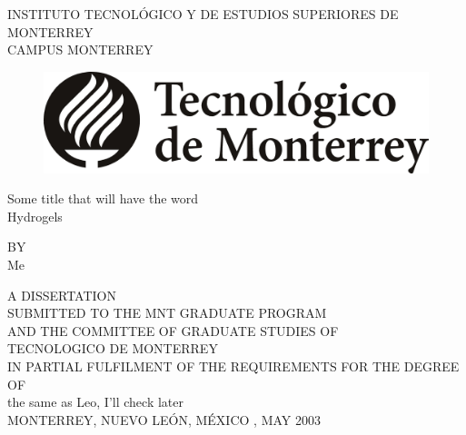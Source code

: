 




\pagestyle{empty} %

\begin{center}
\Large { INSTITUTO TECNOL\'{O}GICO Y DE ESTUDIOS SUPERIORES DE MONTERREY\\}
\normalsize { CAMPUS MONTERREY } \\
\vspace*{1 cm}

\begin{figure}[!h]
 \begin{center}
  \includegraphics[scale=0.2]{pics/LogoTec.jpg}
 \end{center}
\end{figure}
\vspace*{0.6cm}

\Large {Some title that will have the word \\}
\Large {Hydrogels}

\vspace*{1 cm}
\normalsize {BY} \\
\vspace*{1 cm}
\Large {Me}\\
\vspace*{1.5cm}
\normalsize

A DISSERTATION \\
SUBMITTED TO THE MNT GRADUATE PROGRAM \\
AND THE COMMITTEE OF GRADUATE STUDIES OF\\
TECNOLOGICO DE MONTERREY\\
IN PARTIAL FULFILMENT OF THE REQUIREMENTS FOR THE DEGREE OF \\
\vspace*{1.5cm}
\Large {the same as Leo, I'll check later} \\
\normalsize
\vspace*{2.5cm}
MONTERREY, NUEVO LE\'{O}N, M\'{E}XICO , MAY 2003\\
\end{center}

